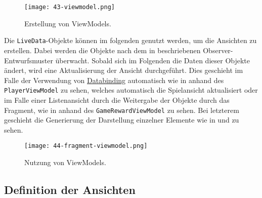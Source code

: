 \begin{figure}[H]
    \texttt{[image: 43-viewmodel.png]}
    \caption{Erstellung von ViewModels.}\label{fig:viewmodel}
\end{figure}

Die \texttt{LiveData}-Objekte können im folgenden genutzt werden, um die Ansichten zu erstellen. Dabei werden die Objekte nach dem in  beschriebenen Observer-Entwurfsmuster überwacht. Sobald sich im Folgenden die Daten dieser Objekte ändert, wird eine Aktualisierung der Ansicht durchgeführt. Dies geschieht im Falle der Verwendung von \hyperref[subsec:databinding]{Databinding} automatisch wie in  anhand des \texttt{PlayerViewModel} zu sehen, welches automatisch die Spielansicht aktualisiert oder im Falle einer Listenansicht durch die Weitergabe der Objekte durch das Fragment, wie in  anhand des \texttt{GameRewardViewModel} zu sehen. Bei letzterem geschieht die Generierung der Darstellung einzelner Elemente wie in  und  zu sehen.

\begin{figure}[H]
    \texttt{[image: 44-fragment-viewmodel.png]}
    \caption{Nutzung von ViewModels.}\label{fig:fragment-viewmodel}
\end{figure}

\subsection{Definition der Ansichten}\label{subsection:views}


